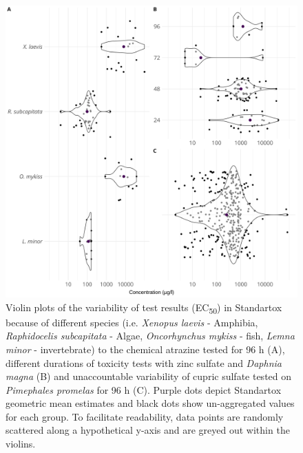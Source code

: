 \begin{figure}[h!]
    \includegraphics[width=1.0\textwidth]{article/figures/results_variability.png}
    \caption{Violin plots of the variability of test results (EC\textsubscript{50}) in Standartox because of different species (i.e. \textit{Xenopus laevis} - Amphibia, \textit{Raphidocelis subcapitata} - Algae, \textit{Oncorhynchus mykiss} - fish, \textit{Lemna minor} - invertebrate) to the chemical atrazine tested for 96 h (A), diﬀerent durations of toxicity tests with zinc sulfate and \textit{Daphnia magna} (B) and unaccountable variability of cupric sulfate tested on \textit{Pimephales promelas} for 96 h (C). Purple dots depict Standartox geometric mean estimates and black dots show un-aggregated values for each group. To facilitate readability, data points are randomly scattered along a hypothetical y-axis and are greyed out within the violins.}
    \label{fig:stx-variability}
\end{figure}

